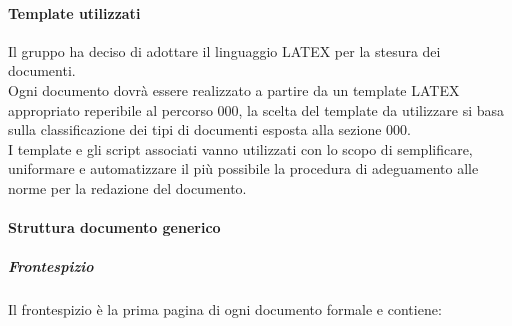 			\paragraph{Template utilizzati }
				Il gruppo ha deciso di adottare il linguaggio LATEX per la stesura dei documenti. \\
				Ogni documento dovrà essere realizzato a partire da un template LATEX appropriato reperibile al percorso 000, la scelta del template da utilizzare si basa sulla classificazione dei tipi di documenti esposta alla sezione 000.\\
				I template e gli script associati vanno utilizzati con lo scopo di semplificare, uniformare e automatizzare il più possibile la procedura di adeguamento alle norme per la redazione del documento.\\
			\paragraph{Struttura documento generico}
				\subparagraph{Frontespizio}
					Il frontespizio è la prima pagina di ogni documento formale e contiene: \\
